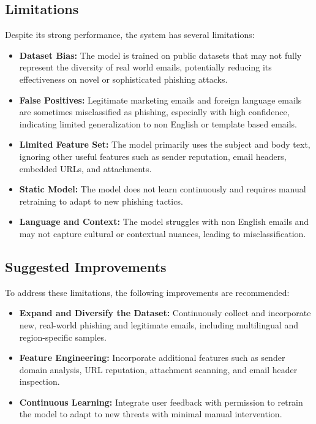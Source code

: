 \documentclass{article}
\begin{document}
\subsection{Limitations}
Despite its strong performance, the system has several limitations:
\begin{itemize}
    \item \textbf{Dataset Bias:} The model is trained on public datasets that may not fully represent the diversity of real world emails, potentially reducing its effectiveness on novel or sophisticated phishing attacks.
    \item \textbf{False Positives:} Legitimate marketing emails and foreign language emails are sometimes misclassified as phishing, especially with high confidence, indicating limited generalization to non English or template based emails.
    \item \textbf{Limited Feature Set:} The model primarily uses the subject and body text, ignoring other useful features such as sender reputation, email headers, embedded URLs, and attachments.
    \item \textbf{Static Model:} The model does not learn continuously and requires manual retraining to adapt to new phishing tactics.
    \item \textbf{Language and Context:} The model struggles with non English emails and may not capture cultural or contextual nuances, leading to misclassification.
\end{itemize}

\subsection{Suggested Improvements}
To address these limitations, the following improvements are recommended:
\begin{itemize}
    \item \textbf{Expand and Diversify the Dataset:} Continuously collect and incorporate new, real-world phishing and legitimate emails, including multilingual and region-specific samples.
    \item \textbf{Feature Engineering:} Incorporate additional features such as sender domain analysis, URL reputation, attachment scanning, and email header inspection.
    \item \textbf{Continuous Learning:} Integrate user feedback with permission to retrain the model to adapt to new threats with minimal manual intervention.
\end{itemize}

\newpage



\end{document}
